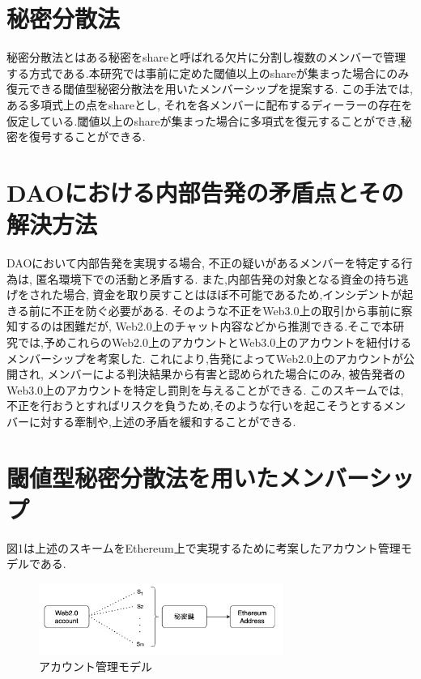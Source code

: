 \documentclass[twocolumn,10pt]{jarticle}
\begin{document}
\section{\normalsize 秘密分散法}
\vspace{-0.2cm}
秘密分散法とはある秘密をshareと呼ばれる欠片に分割し複数のメンバーで管理する方式である.本研究では事前に定めた閾値以上のshareが集まった場合にのみ復元できる閾値型秘密分散法を用いたメンバーシップを提案する.
この手法では, ある多項式上の点をshareとし, それを各メンバーに配布するディーラーの存在を仮定している.閾値以上のshareが集まった場合に多項式を復元することができ,秘密を復号することができる.
\vspace{-0.55cm}
\section{\normalsize DAOにおける内部告発の矛盾点とその解決方法}
\vspace{-0.2cm}
DAOにおいて内部告発を実現する場合, 不正の疑いがあるメンバーを特定する行為は, 匿名環境下での活動と矛盾する.
また,内部告発の対象となる資金の持ち逃げをされた場合, 資金を取り戻すことはほぼ不可能であるため,インシデントが起きる前に不正を防ぐ必要がある.
そのような不正をWeb3.0上の取引から事前に察知するのは困難だが, Web2.0上のチャット内容などから推測できる.そこで本研究では,予めこれらのWeb2.0上のアカウントとWeb3.0上のアカウントを紐付けるメンバーシップを考案した.
これにより,告発によってWeb2.0上のアカウントが公開され, メンバーによる判決結果から有害と認められた場合にのみ, 被告発者のWeb3.0上のアカウントを特定し罰則を与えることができる.
このスキームでは,不正を行おうとすればリスクを負うため,そのような行いを起こそうとするメンバーに対する牽制や,上述の矛盾を緩和することができる.
\vspace{-0.55cm}
\section{\normalsize 閾値型秘密分散法を用いたメンバーシップ}
\vspace{-0.2cm}
図1は上述のスキームをEthereum上で実現するために考案したアカウント管理モデルである.
\begin{figure}[htbp]
  \begin{center}
    \includegraphics[width=80mm]{share.png}
    \caption{アカウント管理モデル}
  \end{center}
\end{figure}
\vspace{-0.55cm}
\end{document}
